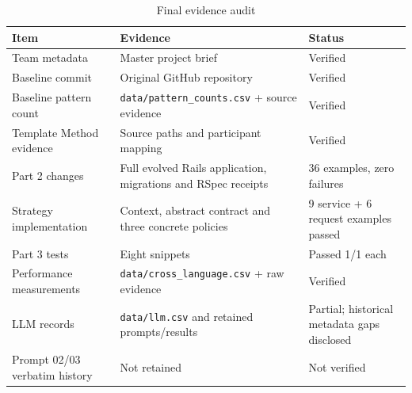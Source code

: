 \documentclass[10pt,a4paper]{article}
\newcommand{\code}[1]{\texttt{\small #1}}
\begin{document}
\begin{table}[H]
\centering
\caption{Final evidence audit}
\label{tab:audit}
\begin{tabularx}{\linewidth}{lXl}
\toprule
Item & Evidence & Status\\
\midrule
Team metadata & Master project brief & Verified\\
Baseline commit & Original GitHub repository & Verified\\
Baseline pattern count & \code{data/pattern\_counts.csv} + source evidence & Verified\\
Template Method evidence & Source paths and participant mapping & Verified\\
Part 2 changes & Full evolved Rails application, migrations and RSpec receipts & 36 examples, zero failures\\
Strategy implementation & Context, abstract contract and three concrete policies & 9 service + 6 request examples passed\\
Part 3 tests & Eight snippets & Passed 1/1 each\\
Performance measurements & \code{data/cross\_language.csv} + raw evidence & Verified\\
LLM records & \code{data/llm.csv} and retained prompts/results & Partial; historical metadata gaps disclosed\\
Prompt 02/03 verbatim history & Not retained & Not verified\\
\bottomrule
\end{tabularx}
\end{table}
\end{document}
